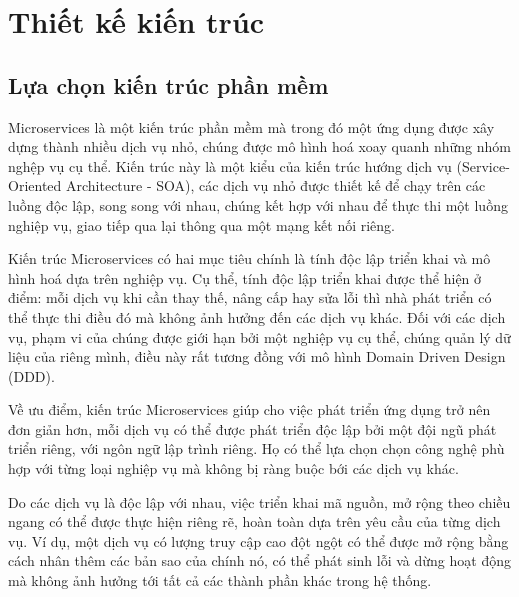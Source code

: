 \documentclass[../DoAn.tex]{subfiles}
\begin{document}
\section{Thiết kế kiến trúc}
\label{section:4.1}
\subsection{Lựa chọn kiến trúc phần mềm}
\label{subsection:4.1.1}
Microservices là một kiến trúc phần mềm mà trong đó một ứng dụng được xây dựng thành nhiều dịch vụ nhỏ, chúng được mô hình hoá xoay quanh những nhóm nghệp vụ cụ thể.
Kiến trúc này là một kiểu của kiến trúc hướng dịch vụ (Service-Oriented Architecture - SOA), các dịch vụ nhỏ được thiết kế để chạy trên các luồng độc lập, song song
với nhau, chúng kết hợp với nhau để thực thi một luồng nghiệp vụ, giao tiếp qua lại thông qua một mạng kết nối riêng.

Kiến trúc Microservices có hai mục tiêu chính là tính độc lập triển khai và mô hình hoá dựa trên nghiệp vụ. Cụ thể, tính độc lập triển khai được thể hiện ở điểm:
mỗi dịch vụ khi cần thay thế, nâng cấp hay sửa lỗi thì nhà phát triển có thể thực thi điều đó mà không ảnh hưởng đến các dịch vụ khác. Đối với các dịch vụ,
phạm vi của chúng được giới hạn bởi một nghiệp vụ cụ thể, chúng quản lý dữ liệu của riêng mình, điều này rất tương đồng với mô hình Domain Driven Design (DDD).

Về ưu điểm, kiến trúc Microservices giúp cho việc phát triển ứng dụng trở nên đơn giản hơn, mỗi dịch vụ có thể được phát triển độc lập bởi một đội ngũ phát triển riêng,
với ngôn ngữ lập trình riêng. Họ có thể lựa chọn chọn công nghệ phù hợp với từng loại nghiệp vụ mà không bị ràng buộc bới các dịch vụ khác.

Do các dịch vụ là độc lập với nhau, việc triển khai mã nguồn, mở rộng theo chiều ngang có thể được thực hiện riêng rẽ, hoàn toàn dựa trên yêu cầu của từng dịch vụ.
Ví dụ, một dịch vụ có lượng truy cập cao đột ngột có thể được mở rộng bằng cách nhân thêm các bản sao của chính nó, có thể phát sinh lỗi và dừng hoạt động mà không ảnh hưởng
tới tất cả các thành phần khác trong hệ thống.
\end{document}
